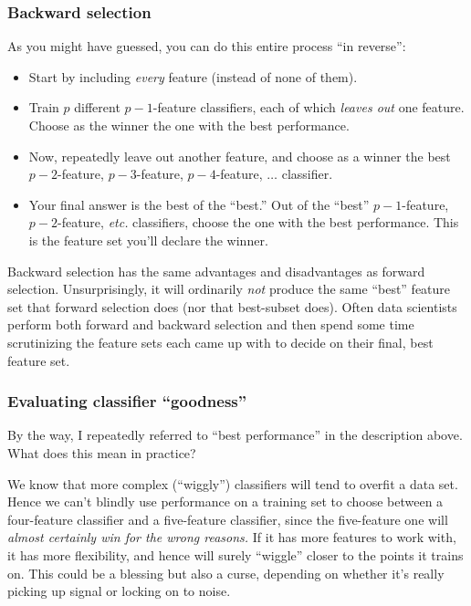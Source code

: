 \documentclass[12pt]{article}
\begin{document}
\subsubsection{Backward selection}

As you might have guessed, you can do this entire process ``in reverse'':

\begin{itemize}
\itemsep.1em
\item Start by including \textit{every} feature (instead of none of them).
\item Train $p$ different $p-1$-feature classifiers, each of which
\textit{leaves out} one feature. Choose as the winner the one with the
best performance.
\item Now, repeatedly leave out another feature, and choose as a winner the
best $p-2$-feature, $p-3$-feature, $p-4$-feature, $\dots$ classifier.
\item Your final answer is the best of the ``best.'' Out of the ``best''
$p-1$-feature, $p-2$-feature, \textit{etc.} classifiers, choose the one with
the best performance. This is the feature set you'll declare the winner.
\end{itemize}

Backward selection has the same advantages and disadvantages as forward
selection. Unsurprisingly, it will ordinarily \textit{not} produce the same
``best'' feature set that forward selection does (nor that best-subset does).
Often data scientists perform both forward and backward selection and then
spend some time scrutinizing the feature sets each came up with to decide on
their final, best feature set.

\subsubsection{Evaluating classifier ``goodness''}

By the way, I repeatedly referred to ``best performance'' in the description
above. What does this mean in practice? 

We know that more complex (``wiggly'') classifiers will tend to overfit a
data set. Hence we can't blindly use performance on a training set to choose
between a four-feature classifier and a five-feature classifier, since the
five-feature one will \textit{almost certainly win for the wrong reasons.} If
it has more features to work with, it has more flexibility, and hence will
surely ``wiggle'' closer to the points it trains on. This could be a blessing
but also a curse, depending on whether it's really picking up signal or
locking on to noise.
\end{document}

